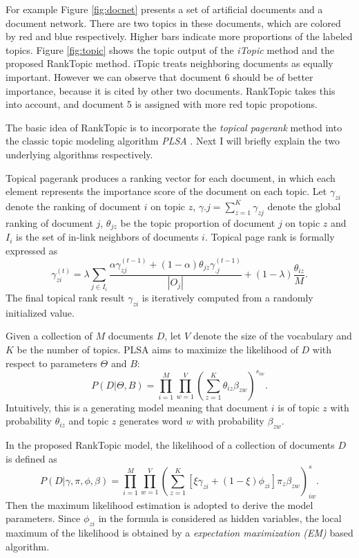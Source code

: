 \documentclass[paper=a4, fontsize=18pt]{article} %
\numberwithin{equation}{section} %
\numberwithin{figure}{section} %
\numberwithin{table}{section} %
\begin{document}
For example Figure \ref{fig:docnet} presents a set of artificial documents and a document network. There are two topics in these documents, which are colored by red and blue respectively. Higher bars indicate more proportions of the labeled topics. Figure \ref{fig:topic} shows the topic output of the \emph{iTopic} \cite{SHGY09} method and the proposed RankTopic method. iTopic treats neighboring documents as equally important. However we can observe that document 6 should be of better importance, because it is cited by other two documents. RankTopic takes this into account, and document 5 is assigned with more red topic propotions.

The basic idea of RankTopic is to incorporate the \emph{topical pagerank} \cite{NDQ06} method into the classic topic modeling algorithm \emph{PLSA} \cite{Hofmann99}. Next I will briefly explain the two underlying algorithms respectively.

Topical pagerank produces a ranking vector for each document, in which each element represents the importance score of the document on each topic. Let $\gamma_{zi}$ denote the ranking of document $i$ on topic $z$, $\gamma{.j} = \sum_{z=1}^K \gamma_{zj}$ denote the global ranking of document $j$, $\theta_{jz}$ be the topic proportion of document $j$ on topic $z$ and $I_i$ is the set of in-link neighbors of documents $i$. Topical page rank is formally expressed as
$$\gamma_{zi}^{(t)} = \lambda \sum_{j \in I_i} \frac{\alpha \gamma_{zj}^{(t-1)} + (1-\alpha)\theta_{jz}\gamma_{.j}^{(t-1)}}{|O_j|} + (1-\lambda) \frac{\theta_{iz}}{M}.$$
The final topical rank result $\gamma_{zi}$ is iteratively computed from a randomly initialized value.

Given a collection of $M$ documents $D$, let $V$ denote the size of the vocabulary and $K$ be the number of topics. PLSA aims to maximize the likelihood of $D$ with respect to parameters $\Theta$ and $B$:
$$P(D|\Theta,B) = \prod^M_{i=1} \prod^V_{w=1} (\sum_{z=1}^K \theta_{iz} \beta_{zw})^{s_{iw}}.$$
Intuitively, this is a generating model meaning that document $i$ is of topic $z$ with probability $\theta_{iz}$ and topic $z$ generates word $w$ with probability $\beta_{zw}$.

In the proposed RankTopic model, the likelihood of a collection of documents $D$ is defined as
$$P(D|\gamma, \pi, \phi, \beta) = \prod^M_{i=1} \prod^V_{w=1} (\sum_{z=1}^K [\xi \gamma_{zi} + (1-\xi)\phi_{zi}]\pi_z \beta_{zw})^s_{iw}.$$
Then the maximum likelihood estimation is adopted to derive the model parameters. Since $\phi_{zi}$ in the formula is considered as hidden variables, the local maximum of the likelihood is obtained by a \emph{expectation maximization (EM)} based algorithm.
\end{document}
